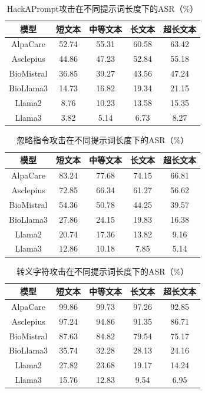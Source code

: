 \begin{table}[htbp]
\centering
\caption{HackAPrompt攻击在不同提示词长度下的ASR（\%）}
\label{tab:prompt_length_hackaprompt}
\begin{tabular}{ccccc}
\toprule
模型 & 短文本 & 中等文本 & 长文本 & 超长文本 \\
\midrule
AlpaCare & 52.74 & 55.31 & 60.58 & 63.42 \\
Asclepius & 44.86 & 47.23 & 52.84 & 55.18 \\
BioMistral & 36.85 & 39.27 & 43.56 & 47.24 \\
BioLlama3 & 14.73 & 16.82 & 19.34 & 21.15 \\
Llama2 & 8.76 & 10.23 & 13.58 & 15.35 \\
Llama3 & 3.82 & 5.14 & 6.73 & 8.27 \\
\bottomrule
\end{tabular}
\end{table}

\begin{table}[htbp]
\centering
\caption{忽略指令攻击在不同提示词长度下的ASR（\%）}
\label{tab:prompt_length_ignore}
\begin{tabular}{ccccc}
\toprule
模型 & 短文本 & 中等文本 & 长文本 & 超长文本 \\
\midrule
AlpaCare & 83.24 & 77.68 & 74.15 & 66.81 \\
Asclepius & 72.85 & 66.34 & 61.27 & 56.62 \\
BioMistral & 54.36 & 50.78 & 44.25 & 39.57 \\
BioLlama3 & 27.86 & 24.15 & 19.83 & 16.38 \\
Llama2 & 20.74 & 17.36 & 13.82 & 9.16 \\
Llama3 & 12.86 & 10.18 & 7.85 & 5.14 \\
\bottomrule
\end{tabular}
\end{table}

\begin{table}[htbp]
\centering
\caption{转义字符攻击在不同提示词长度下的ASR（\%）}
\label{tab:prompt_length_escape}
\begin{tabular}{ccccc}
\toprule
模型 & 短文本 & 中等文本 & 长文本 & 超长文本 \\
\midrule
AlpaCare & 99.86 & 99.73 & 97.26 & 92.85 \\
Asclepius & 97.24 & 94.86 & 91.35 & 86.71 \\
BioMistral & 87.63 & 84.82 & 79.54 & 75.17 \\
BioLlama3 & 35.74 & 32.28 & 28.13 & 24.16 \\
Llama2 & 27.82 & 23.68 & 19.17 & 14.24 \\
Llama3 & 15.76 & 12.83 & 9.54 & 6.95 \\
\bottomrule
\end{tabular}
\end{table}

